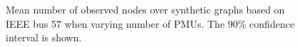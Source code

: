 \begin{figure}[t]
  \begin{center}
  \end{center}
	\caption{Mean number of observed nodes over synthetic graphs based on IEEE bus $57$ when varying number of PMUs. The $90\%$ confidence interval is shown.}
\end{figure}






